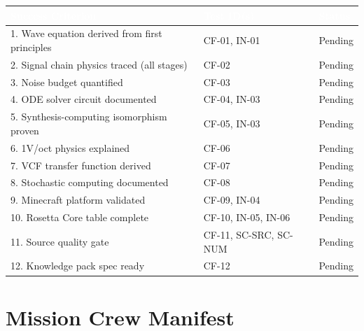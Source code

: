 \documentclass[11pt,letterpaper]{article}
\newcommand{\tableheader}[1]{\textbf{\sffamily\textcolor{white}{#1}}}
\begin{document}
\begin{center}
\begin{tabularx}{\textwidth}{XL{3.5cm}C{1.5cm}}
\toprule
{}
\tableheader{Success Criterion} & \tableheader{Test ID(s)} & \tableheader{Status} \\
. Wave equation derived from first principles & CF-01, IN-01 & Pending \\
2. Signal chain physics traced (all stages) & CF-02 & Pending \\
3. Noise budget quantified & CF-03 & Pending \\
4. ODE solver circuit documented & CF-04, IN-03 & Pending \\
5. Synthesis-computing isomorphism proven & CF-05, IN-03 & Pending \\
6. 1V/oct physics explained & CF-06 & Pending \\
7. VCF transfer function derived & CF-07 & Pending \\
8. Stochastic computing documented & CF-08 & Pending \\
9. Minecraft platform validated & CF-09, IN-04 & Pending \\
10. Rosetta Core table complete & CF-10, IN-05, IN-06 & Pending \\
11. Source quality gate & CF-11, SC-SRC, SC-NUM & Pending \\
12. Knowledge pack spec ready & CF-12 & Pending \\
\bottomrule
\end{tabularx}
\end{center}

\section{Mission Crew Manifest}
\end{document}
